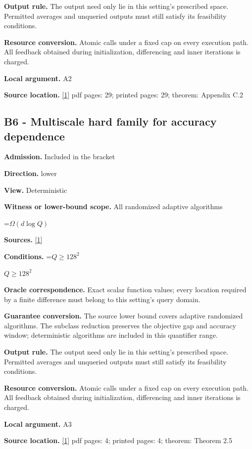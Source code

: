 \documentclass[10pt,a4paper]{article}
\newcommand{\AtlasMath}[1]{\par\begingroup\centering\setbox0=\hbox{$\displaystyle #1$}\ifdim\wd0>1.4\linewidth\typeout{ATLAS WIDE FORMULA: \the\wd0}\fi\ifdim\wd0>\linewidth\resizebox{\linewidth}{!}{\box0}\else\box0\fi\par\endgroup}
\newcommand{\AtlasInlineMath}[1]{\begingroup\setbox0=\hbox{$#1$}\ifdim\wd0>.4\linewidth\endgroup\AtlasMath{#1}\else\endgroup$#1$\fi}
\begin{document}
\textbf{Output rule.} The output need only lie in this setting's prescribed space. Permitted averages and unqueried outputs must still satisfy its feasibility conditions.

\textbf{Resource conversion.} Atomic calls under a fixed cap on every execution path. All feedback obtained during initialization, differencing and inner iterations is charged.

\textbf{Local argument.} A2

\textbf{Source location.} \href{https://arxiv.org/html/2610.00345v1}{[1]} pdf pages: 29; printed pages: 29; theorem: Appendix C.2

\subsection{B6 - Multiscale hard family for accuracy dependence}
\textbf{Admission.} Included in the bracket

\textbf{Direction.} lower

\textbf{View.} Deterministic

\textbf{Witness or lower-bound scope.} All randomized adaptive algorithms

\AtlasMath{\Omega(d\log Q)}
\textbf{Sources.} \href{https://arxiv.org/html/2610.00345v1}{[1]}

\textbf{Conditions.} \AtlasInlineMath{Q\ge128^2}

\textbf{Oracle correspondence.} Exact scalar function values; every location required by a finite difference must belong to this setting's query domain.

\textbf{Guarantee conversion.} The source lower bound covers adaptive randomized algorithms. The subclass reduction preserves the objective gap and accuracy window; deterministic algorithms are included in this quantifier range.

\textbf{Output rule.} The output need only lie in this setting's prescribed space. Permitted averages and unqueried outputs must still satisfy its feasibility conditions.

\textbf{Resource conversion.} Atomic calls under a fixed cap on every execution path. All feedback obtained during initialization, differencing and inner iterations is charged.

\textbf{Local argument.} A3

\textbf{Source location.} \href{https://arxiv.org/html/2610.00345v1}{[1]} pdf pages: 4; printed pages: 4; theorem: Theorem 2.5
\end{document}
